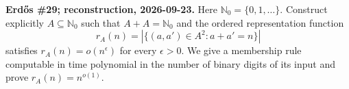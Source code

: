 \textbf{Erd\H{o}s \#29; reconstruction, 2026-09-23.}
Here $\mathbb N_0=\{0,1,\ldots\}$. Construct explicitly
$A\subseteq\mathbb N_0$ such that $A+A=\mathbb N_0$ and the ordered
representation function
\[
 r_A(n)=|\{(a,a')\in A^2:a+a'=n\}|
\]
satisfies $r_A(n)=o(n^\epsilon)$ for every $\epsilon>0$.
We give a membership rule computable in time polynomial in the number
of binary digits of its input and prove $r_A(n)=n^{o(1)}$.
